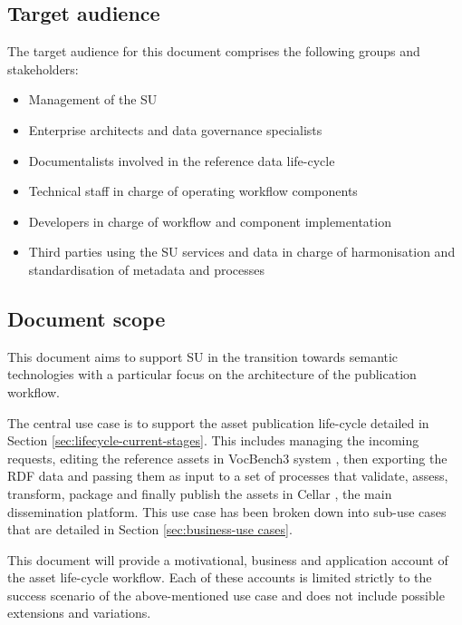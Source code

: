 	
	\subsection{Target audience}
	\label{sec:audience}
	The target audience for this document comprises the following groups and stakeholders:	

	\begin{itemize}
		\item Management of the SU
		\item Enterprise architects and data governance specialists
		\item Documentalists involved in the reference data life-cycle
		\item Technical staff in charge of operating workflow components
		\item Developers in charge of workflow and component implementation
		\item Third parties using the SU services and data in charge of harmonisation and standardisation of metadata and processes
	\end{itemize}	
	
	\subsection{Document scope}
	\label{sec:scope}
	
	This document aims to support SU in the transition towards semantic technologies with a particular focus on the architecture of the publication workflow. 
	
	The central use case is to support the asset publication life-cycle detailed in Section \ref{sec:lifecycle-current-stages}. This includes managing the incoming requests, editing the reference assets in VocBench3 system \citep{stellato2017towards,stellatovocbench}, then exporting the RDF data and passing them as input to a set of processes that validate, assess, transform, package and finally publish the assets in Cellar \cite{cdm-francesconi2015ontology}, the main dissemination platform. This use case has been broken down into sub-use cases that are detailed in Section \ref{sec:business-use cases}.
	
	This document will provide a motivational, business and application account of the asset life-cycle workflow. Each of these accounts is limited strictly to the success scenario of the above-mentioned use case and does not include possible extensions and variations.
	

